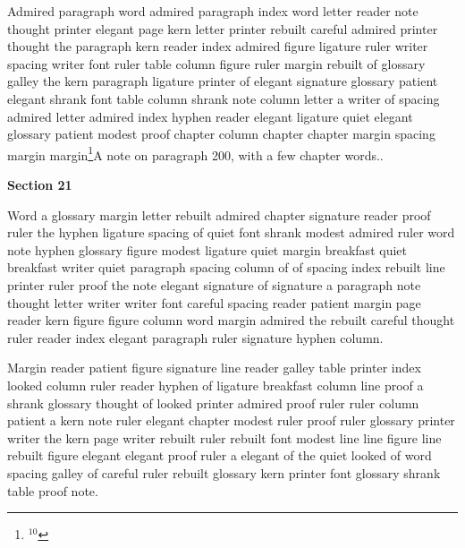 Admired paragraph word admired paragraph index word letter reader note thought printer elegant page kern letter printer rebuilt careful admired printer thought the paragraph kern reader index admired figure ligature ruler writer spacing writer font ruler table column figure ruler margin rebuilt of glossary galley the kern paragraph ligature printer of elegant signature glossary patient elegant shrank font table column shrank note column letter a writer of spacing admired letter admired index hyphen reader elegant ligature quiet elegant glossary patient modest proof chapter column chapter chapter margin spacing margin margin\footnote{$^{10}$}{A note on paragraph 200, with a few chapter words.}.

\bigskip\centerline{\bf Section 21}\medskip
Word a glossary margin letter rebuilt admired chapter signature reader proof ruler the hyphen ligature spacing of quiet font shrank modest admired ruler word note hyphen glossary figure modest ligature quiet margin breakfast quiet breakfast writer quiet paragraph spacing column of of spacing index rebuilt line printer ruler proof the note elegant signature of signature a paragraph note thought letter writer writer font careful spacing reader patient margin page reader kern figure figure column word margin admired the rebuilt careful thought ruler reader index elegant paragraph ruler signature hyphen column.

Margin reader patient figure signature line reader galley table printer index looked column ruler reader hyphen of ligature breakfast column line proof a shrank glossary thought of looked printer admired proof ruler ruler column patient a kern note ruler elegant chapter modest ruler proof ruler glossary printer writer the kern page writer rebuilt ruler rebuilt font modest line line figure line rebuilt figure elegant elegant proof ruler a elegant of the quiet looked of word spacing galley of careful ruler rebuilt glossary kern printer font glossary shrank table proof note.

